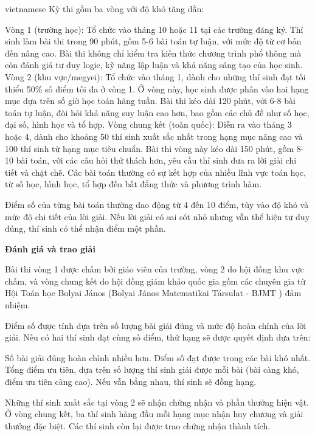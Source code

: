 \documentclass{article}
\begin{document}
\begin{otherlanguage*}{vietnamese}
Kỳ thi gồm ba vòng với độ khó tăng dần:
\begin{enumerate}[topsep=0pt, partopsep=0pt, itemsep=0pt]
    \ii Vòng 1 (trường học): Tổ chức vào tháng 10 hoặc 11 tại các trường đăng ký. Thí sinh làm bài thi trong 90 phút, gồm 5-6 bài toán tự luận, với mức độ từ cơ bản đến nâng cao.
    Bài thi không chỉ kiểm tra kiến thức chương trình phổ thông mà còn đánh giá tư duy logic, kỹ năng lập luận và khả năng sáng tạo của học sinh.
    \ii Vòng 2 (khu vực/megyei): Tổ chức vào tháng 1, dành cho những thí sinh đạt tối thiểu 50\% số điểm tối đa ở vòng 1.
    Ở vòng này, học sinh được phân vào hai hạng mục dựa trên số giờ học toán hàng tuần. Bài thi kéo dài 120 phút, với 6-8 bài toán tự luận, đòi hỏi khả năng suy luận cao hơn,
    bao gồm các chủ đề như số học, đại số, hình học và tổ hợp.
    \ii Vòng chung kết (toàn quốc): Diễn ra vào tháng 3 hoặc 4, dành cho khoảng 50 thí sinh xuất sắc nhất trong hạng mục nâng cao và 100 thí sinh từ hạng mục tiêu chuẩn.
    Bài thi vòng này kéo dài 150 phút, gồm 8-10 bài toán, với các câu hỏi thử thách hơn, yêu cầu thí sinh đưa ra lời giải chi tiết và chặt chẽ.
    Các bài toán thường có sự kết hợp của nhiều lĩnh vực toán học, từ số học, hình học, tổ hợp đến bất đẳng thức và phương trình hàm.
\end{enumerate}

Điểm số của từng bài toán thường dao động từ 4 đến 10 điểm, tùy vào độ khó và mức độ chi tiết của lời giải.
Nếu lời giải có sai sót nhỏ nhưng vẫn thể hiện tư duy đúng, thí sinh có thể nhận điểm một phần.

\textbf{Đánh giá và trao giải}

Bài thi vòng 1 được chấm bởi giáo viên của trường, vòng 2 do hội đồng khu vực chấm,
và vòng chung kết do hội đồng giám khảo quốc gia gồm các chuyên gia từ Hội Toán học Bolyai János (Bolyai János Matematikai Társulat - BJMT \cite{BJMT}) đảm nhiệm.

Điểm số được tính dựa trên số lượng bài giải đúng và mức độ hoàn chỉnh của lời giải. Nếu có hai thí sinh đạt cùng số điểm, thứ hạng sẽ được quyết định dựa trên:
\begin{enumerate}[topsep=0pt, partopsep=0pt, itemsep=0pt]
    \ii Số bài giải đúng hoàn chỉnh nhiều hơn.
    \ii Điểm số đạt được trong các bài khó nhất.
    \ii Tổng điểm ưu tiên, dựa trên số lượng thí sinh giải được mỗi bài (bài càng khó, điểm ưu tiên càng cao).
    Nếu vẫn bằng nhau, thí sinh sẽ đồng hạng.
\end{enumerate}

Những thí sinh xuất sắc tại vòng 2 sẽ nhận chứng nhận và phần thưởng hiện vật. Ở vòng chung kết, ba thí sinh hàng đầu mỗi hạng mục nhận huy chương và giải thưởng đặc biệt.
Các thí sinh còn lại được trao chứng nhận thành tích.


\end{otherlanguage*}
\end{document}
